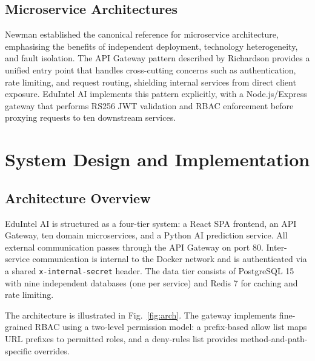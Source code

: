 \documentclass[conference]{IEEEtran}
\begin{document}
\subsection{Microservice Architectures}

Newman \cite{newman2021} established the canonical reference for microservice
architecture, emphasising the benefits of independent deployment, technology
heterogeneity, and fault isolation. The API Gateway pattern described by
Richardson \cite{richardson2018} provides a unified entry point that handles
cross-cutting concerns such as authentication, rate limiting, and request
routing, shielding internal services from direct client exposure. EduIntel AI
implements this pattern explicitly, with a Node.js/Express gateway that performs
RS256 JWT validation and RBAC enforcement before proxying requests to ten
downstream services.

\section{System Design and Implementation}

\subsection{Architecture Overview}

EduIntel AI is structured as a four-tier system: a React SPA frontend, an API
Gateway, ten domain microservices, and a Python AI prediction service. All
external communication passes through the API Gateway on port 80. Inter-service
communication is internal to the Docker network and is authenticated via a
shared \texttt{x-internal-secret} header. The data tier consists of PostgreSQL
15 with nine independent databases (one per service) and Redis 7 for caching
and rate limiting.

The architecture is illustrated in Fig.~\ref{fig:arch}. The gateway implements
fine-grained RBAC using a two-level permission model: a prefix-based allow list
maps URL prefixes to permitted roles, and a deny-rules list provides
method-and-path-specific overrides.
\end{document}
